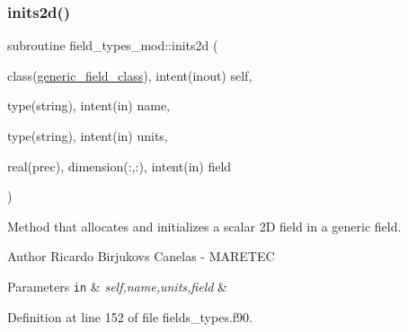 \subsubsection{\texorpdfstring{inits2d()}{inits2d()}}
{\footnotesize\ttfamily subroutine field\+\_\+types\+\_\+mod\+::inits2d (\begin{DoxyParamCaption}\item[{class(\mbox{\hyperlink{structfield__types__mod_1_1generic__field__class}{generic\+\_\+field\+\_\+class}}), intent(inout)}]{self,  }\item[{type(string), intent(in)}]{name,  }\item[{type(string), intent(in)}]{units,  }\item[{real(prec), dimension(\+:,\+:), intent(in)}]{field }\end{DoxyParamCaption})\hspace{0.3cm}{\ttfamily [private]}}



Method that allocates and initializes a scalar 2D field in a generic field. 

\begin{DoxyAuthor}{Author}
Ricardo Birjukovs Canelas -\/ M\+A\+R\+E\+T\+EC 
\end{DoxyAuthor}

\begin{DoxyParams}[1]{Parameters}
\mbox{\tt in}  & {\em self,name,units,field} & \\
\hline
\end{DoxyParams}


Definition at line 152 of file fields\+\_\+types.\+f90.


